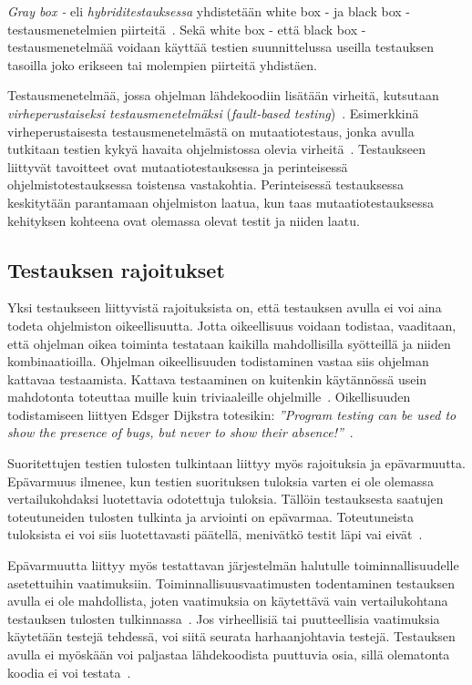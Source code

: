 \documentclass[finnish, grading]{tktltiki2}
\theoremstyle{definition}
\theoremstyle{remark}
\begin{document}
\textit{Gray box -} eli \textit{hybriditestauksessa} yhdistetään white box - ja black box -testausmenetelmien piirteitä~\cite[s. 52]{Binder:1999}. Sekä white box - että black box -testausmenetelmää voidaan käyttää testien suunnittelussa useilla testauksen tasoilla joko erikseen tai molempien piirteitä yhdistäen.

Testausmenetelmää, jossa ohjelman lähdekoodiin lisätään virheitä, kutsutaan \textit{virheperustaiseksi testausmenetelmäksi} (\textit{fault-based testing})~\cite[s. 52]{Binder:1999}. Esimerkkinä virheperustaisesta testausmenetelmästä on mutaatiotestaus, jonka avulla tutkitaan testien kykyä havaita ohjelmistossa olevia virheitä~\cite[s. 36]{DeMillo:Lipton:Sayward:1978}. Testaukseen liittyvät tavoitteet ovat mutaatiotestauksessa ja perinteisessä ohjelmistotestauksessa toistensa vastakohtia. Perinteisessä testauksessa keskitytään parantamaan ohjelmiston laatua, kun taas mutaatiotestauksessa kehityksen kohteena ovat olemassa olevat testit ja niiden laatu.

\subsection{Testauksen rajoitukset}

Yksi testaukseen liittyvistä rajoituksista on, että testauksen avulla ei voi aina todeta ohjelmiston oikeellisuutta. Jotta oikeellisuus voidaan todistaa, vaaditaan, että ohjelman oikea toiminta testataan kaikilla mahdollisilla syötteillä ja niiden kombinaatioilla. Ohjelman oikeellisuuden todistaminen vastaa siis ohjelman kattavaa testaamista. Kattava testaaminen on kuitenkin käytännössä usein mahdotonta toteuttaa muille kuin triviaaleille ohjelmille~\cite[s. 58]{Binder:1999}. Oikellisuuden todistamiseen liittyen Edsger Dijkstra totesikin: \textit{''Program testing can be used to show the presence of bugs, but never to show their absence!''}~\cite[s. 6]{Dahl:Dijkstra:Hoare:1972}.

Suoritettujen testien tulosten tulkintaan liittyy myös rajoituksia ja epävarmuutta. Epävarmuus ilmenee, kun testien suorituksen tuloksia varten ei ole olemassa  vertailukohdaksi luotettavia odotettuja tuloksia. Tällöin testauksesta saatujen toteutuneiden tulosten tulkinta ja arviointi on epävarmaa. Toteutuneista tuloksista ei voi siis luotettavasti päätellä, menivätkö testit läpi vai eivät~\cite[s. 58]{Binder:1999}. 

Epävarmuutta liittyy myös testattavan järjestelmän halutulle toiminnallisuudelle asetettuihin vaatimuksiin. Toiminnallisuusvaatimusten todentaminen testauksen avulla ei ole mahdollista, joten vaatimuksia on käytettävä vain vertailukohtana testauksen tulosten tulkinnassa~\cite[s. 58]{Binder:1999}. Jos virheellisiä tai puutteellisia vaatimuksia käytetään testejä tehdessä, voi siitä seurata harhaanjohtavia testejä. Testauksen avulla ei myöskään voi paljastaa lähdekoodista puuttuvia osia, sillä olematonta koodia ei voi testata~\cite[s. 58]{Binder:1999}.
\end{document}
